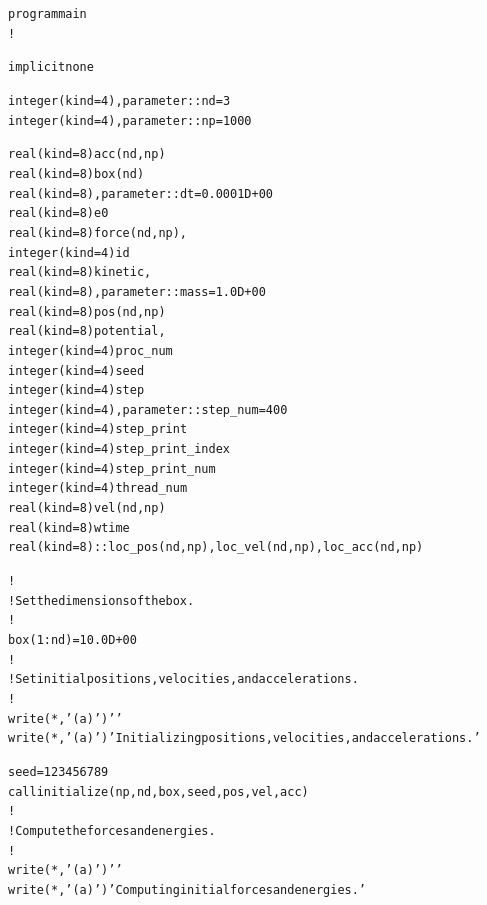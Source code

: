 \documentclass{article}
\begin{document}
{\tiny{\begin{alltt}
  program main
!
 {\color{red}{ use mpi}}

  implicit none

  integer ( kind = 4 ), parameter :: nd = 3
  integer ( kind = 4 ), parameter :: np = 1000

  real ( kind = 8 ) acc(nd,np)
  real ( kind = 8 ) box(nd)
  real ( kind = 8 ), parameter :: dt = 0.0001D+00
  real ( kind = 8 ) e0
  real ( kind = 8 ) force(nd,np), {\color{red}{loc_force(nd,np)}}
  integer ( kind = 4 ) id
  real ( kind = 8 ) kinetic, {\color{red}{loc_kinetic}}
  real ( kind = 8 ), parameter :: mass = 1.0D+00
  real ( kind = 8 ) pos(nd,np)
  real ( kind = 8 ) potential , {\color{red}{loc_potential}}
  integer ( kind = 4 ) proc_num
  integer ( kind = 4 ) seed
  integer ( kind = 4 ) step
  integer ( kind = 4 ), parameter :: step_num = 400
  integer ( kind = 4 ) step_print
  integer ( kind = 4 ) step_print_index
  integer ( kind = 4 ) step_print_num
  integer ( kind = 4 ) thread_num
  real ( kind = 8 ) vel(nd,np)
  real ( kind = 8 ) wtime
 {\color{red} {real(kind=8):: loc_pos(nd,np), loc_vel(nd,np), loc_acc(nd,np)}}

 {\color{red}{ integer(kind=4)::ierr, myrank, numprocs
  integer status(MPI_STATUS_SIZE)
!
!  Initialize MPI.
!
  call MPI_Init ( ierr )
!
!  Get this process's ID.
!
  call MPI_Comm_rank ( MPI_COMM_WORLD, myrank, ierr )
!
!  Find out how many processes are available.
!
  call MPI_Comm_size ( MPI_COMM_WORLD, numprocs, ierr )

  call timestamp ( )

  wtime = MPI_Wtime ( )}}

!
!  Set the dimensions of the box.
!
  box(1:nd) = 10.0D+00
!
!  Set initial positions, velocities, and accelerations.
!
  write ( *, '(a)' ) ' '
  write ( *, '(a)' ) '  Initializing positions, velocities, and accelerations.'

  seed = 123456789
  call initialize ( np, nd, box, seed, pos, vel, acc )
!
!  Compute the forces and energies.
!
  write ( *, '(a)' ) ' '
  write ( *, '(a)' ) '  Computing initial forces and energies.'

 {\color{red}{call compute ( np, nd, pos, vel, mass, loc_force, loc_potential, loc_kinetic,myrank,numprocs )
 call MPI_Allreduce(loc_force, force,nd*np , MPI_Double, MPI_SUM,  MPI_COMM_WORLD, ierr)
 call MPI_Allreduce(loc_potential, potential, 1  , MPI_Double, MPI_SUM,  MPI_COMM_WORLD, ierr)
 call MPI_Allreduce(loc_kinetic, kinetic, 1  , MPI_Double, MPI_SUM, MPI_COMM_WORLD, ierr)}}


\end{alltt}}}
\end{document}
